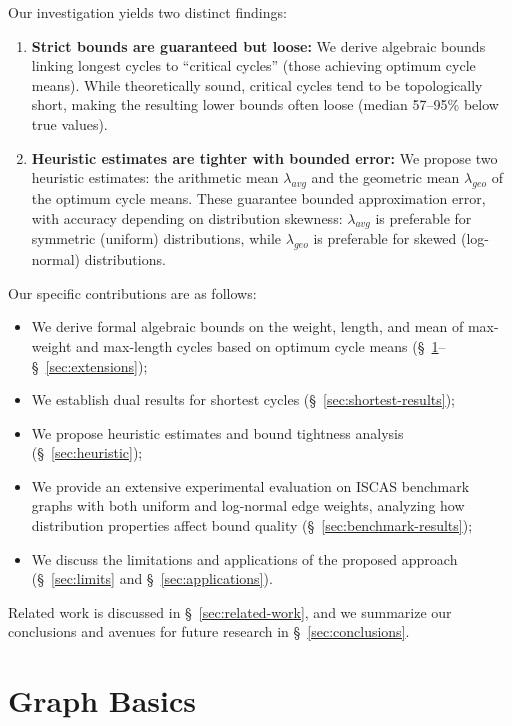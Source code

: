 \documentclass{article}
\theoremstyle{definition}
\begin{document}
Our investigation yields two distinct findings:
\begin{enumerate}
\item \textbf{Strict bounds are guaranteed but loose:}
  We derive algebraic bounds linking longest cycles to ``critical
  cycles'' (those achieving optimum cycle means). While theoretically
  sound, critical cycles tend to be topologically short, making the 
  resulting lower bounds often loose (median 57--95\% below true values).
\item \textbf{Heuristic estimates are tighter with bounded error:} We
  propose two heuristic estimates: the arithmetic mean
  $\lambda_{avg}$ and the geometric mean $\lambda_{geo}$ of the
  optimum cycle means. These guarantee bounded approximation error, 
  with accuracy depending on distribution skewness: $\lambda_{avg}$ 
  is preferable for symmetric (uniform) distributions, while
  $\lambda_{geo}$ is preferable for skewed (log-normal) distributions.
\end{enumerate}

Our specific contributions are as follows:
\begin{itemize}
    \item We derive formal algebraic bounds on the weight, length, and
      mean of max-weight and max-length cycles based on optimum cycle
      means (\S~\ref{sec:graph}--\S~\ref{sec:extensions});
    \item We establish dual results for shortest cycles
      (\S~\ref{sec:shortest-results});
    \item We propose heuristic estimates and bound tightness
      analysis (\S~\ref{sec:heuristic});
    \item We provide an extensive experimental evaluation on ISCAS
      benchmark graphs with both uniform and log-normal edge weights,
      analyzing how distribution properties affect bound quality
      (\S~\ref{sec:benchmark-results});
    \item We discuss the limitations and applications of the proposed
      approach (\S~\ref{sec:limits} and \S~\ref{sec:applications}).
\end{itemize}

Related work is discussed in \S~\ref{sec:related-work}, and we
summarize our conclusions and avenues for future research in
\S~\ref{sec:conclusions}.

\section{Graph Basics}
\label{sec:graph}
\end{document}
